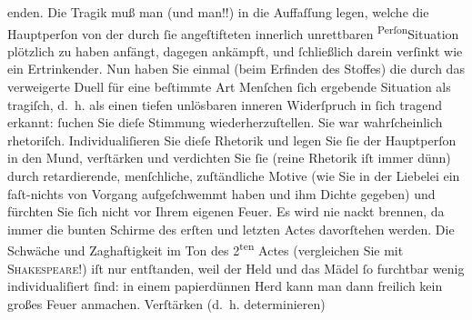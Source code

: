 \begin{ledgroupsized}[t]{13cm}
                    enden. Die Tragik muß man (und  man!!) in
                    die Auffaſſung legen, welche die Hauptperſon von der durch ſie angeſtifteten {\pb}innerlich unrettbaren \substVorne{}\textsuperscript{Perſon}{\allowbreak}\substDazwischen{}Situation\substHinten{} plötzlich zu haben anfängt, dagegen ankämpft, und ſchließlich darein
                    verſinkt wie ein Ertrinkender. Nun haben Sie einmal (beim Erfinden des Stoffes) die durch das verweigerte Duell für
                    eine beſtimmte Art Menſchen ſich ergebende Situation als tragiſch, d. h. als
                    einen tiefen unlösbaren inneren Widerſpruch in ſich tragend erkannt: {\pb}ſuchen Sie dieſe Stimmung
                    wiederherzuſtellen. Sie war wahrſcheinlich rhetoriſch. Individualiſieren Sie
                    dieſe Rhetorik und legen Sie ſie der Hauptperſon in den Mund, verſtärken und
                    verdichten Sie ſie (reine Rhetorik iſt immer dünn) durch retardierende,
                    menſchliche, zuſtändliche Motive (wie Sie in der Liebelei ein faſt-nichts von Vorgang aufgeſchwemmt haben und ihm
                    Dichte gegeben) {\pb}und fürchten
                    Sie ſich nicht vor Ihrem eigenen Feuer. Es wird nie nackt brennen, da immer die
                    bunten Schirme des erſten und letzten Actes davorſtehen werden. Die Schwäche und
                    Zaghaftigkeit im Ton des 2\textsuperscript{ten} Actes (vergleichen Sie mit \textsc{Shakeſpeare}!) iſt nur entſtanden, weil der Held und das Mädel ſo furchtbar wenig
                    individualiſiert ſind: in einem papierdünnen Herd kann man dann freilich kein
                    großes Feuer anmachen. {\pb}Verſtärken \introOben{}(d. h. determinieren)\introOben{}

\end{ledgroupsized}
